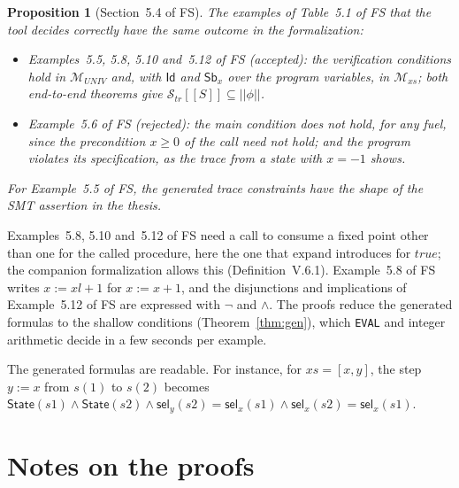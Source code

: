 \documentclass[11pt]{article}
\newcommand{\sem}[1]{[\![ #1 ]\!]}
\newcommand{\fsem}[1]{|\!|#1|\!|}
\newcommand{\Str}{{\mathcal{S}_{\mathit{tr}}}}
\newcommand{\Id}{\mathsf{Id}}
\newcommand{\Sb}[2]{\mathsf{Sb}^{#1}_{#2}}
\newcommand{\M}{\mathcal{M}}
\newcommand{\tsel}[1]{\mathsf{sel}_{#1}}
\newcommand{\Th}[1]{#1 of FS}
\theoremstyle{plain}
\newtheorem{proposition}[theorem]{Proposition}
\theoremstyle{definition}
\theoremstyle{remark}
\begin{document}
\begin{proposition}[\Th{Section~5.4}]\label{prop:ex-eval}
  The examples of \Th{Table~5.1} that the tool decides correctly have the
  same outcome in the formalization:
  \begin{itemize}
  \item \Th{Examples~5.5, 5.8, 5.10 and~5.12} (accepted): the
    verification conditions hold in $\M_{\mathit{UNIV}}$ and, with $\Id$
    and $\Sb{}{x}$ over the program variables, in $\M_{xs}$; both
    end-to-end theorems give $\Str\sem{S} \subseteq \fsem{\phi}$.
  \item \Th{Example~5.6} (rejected): the main condition does not hold,
    for any fuel, since the precondition $x \ge 0$ of the call need not
    hold; and the program violates its specification, as the trace from a
    state with $x = -1$ shows.
  \end{itemize}
  For \Th{Example~5.5}, the generated trace constraints have the shape of
  the SMT assertion in the thesis.
\end{proposition}

\Th{Examples~5.8, 5.10 and~5.12} need a call to consume a fixed point
other than one for the called procedure, here the one that
$\mathrm{expand}$ introduces for $\mathit{true}$; the companion
formalization allows this (Definition~V.6.1). \Th{Example~5.8} writes
$x := xl + 1$ for $x := x + 1$, and the disjunctions and implications of
\Th{Example~5.12} are expressed with $\neg$ and $\land$. The proofs reduce
the generated formulas to the shallow conditions
(Theorem~\ref{thm:gen}), which \texttt{EVAL} and integer arithmetic
decide in a few seconds per example.

The generated formulas are readable. For instance, for $xs = [x, y]$,
the step $y := x$ from $s(1)$ to $s(2)$ becomes
$\mathsf{State}(s1) \land \mathsf{State}(s2) \land \tsel{y}(s2) =
\tsel{x}(s1) \land \tsel{x}(s2) = \tsel{x}(s1)$.

\section{Notes on the proofs}\label{sec:notes}
\end{document}
